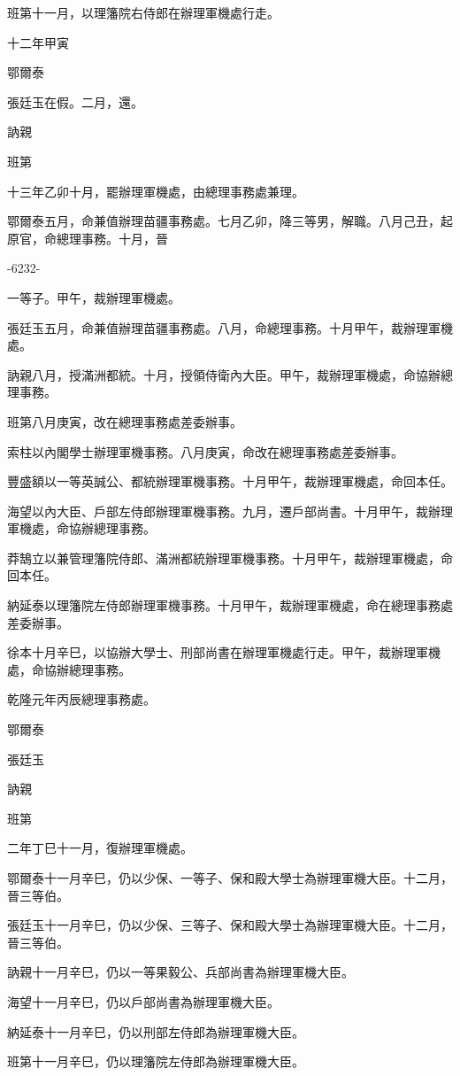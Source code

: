 \begin{pinyinscope}
班第十一月，以理籓院右侍郎在辦理軍機處行走。

十二年甲寅

鄂爾泰

張廷玉在假。二月，還。

訥親

班第

十三年乙卯十月，罷辦理軍機處，由總理事務處兼理。

鄂爾泰五月，命兼值辦理苗疆事務處。七月乙卯，降三等男，解職。八月己丑，起原官，命總理事務。十月，晉

-6232-

一等子。甲午，裁辦理軍機處。

張廷玉五月，命兼值辦理苗疆事務處。八月，命總理事務。十月甲午，裁辦理軍機處。

訥親八月，授滿洲都統。十月，授領侍衛內大臣。甲午，裁辦理軍機處，命協辦總理事務。

班第八月庚寅，改在總理事務處差委辦事。

索柱以內閣學士辦理軍機事務。八月庚寅，命改在總理事務處差委辦事。

豐盛額以一等英誠公、都統辦理軍機事務。十月甲午，裁辦理軍機處，命回本任。

海望以內大臣、戶部左侍郎辦理軍機事務。九月，遷戶部尚書。十月甲午，裁辦理軍機處，命協辦總理事務。

莽鵠立以兼管理籓院侍郎、滿洲都統辦理軍機事務。十月甲午，裁辦理軍機處，命回本任。

納延泰以理籓院左侍郎辦理軍機事務。十月甲午，裁辦理軍機處，命在總理事務處差委辦事。

徐本十月辛巳，以協辦大學士、刑部尚書在辦理軍機處行走。甲午，裁辦理軍機處，命協辦總理事務。

乾隆元年丙辰總理事務處。

鄂爾泰

張廷玉

訥親

班第

二年丁巳十一月，復辦理軍機處。

鄂爾泰十一月辛巳，仍以少保、一等子、保和殿大學士為辦理軍機大臣。十二月，晉三等伯。

張廷玉十一月辛巳，仍以少保、三等子、保和殿大學士為辦理軍機大臣。十二月，晉三等伯。

訥親十一月辛巳，仍以一等果毅公、兵部尚書為辦理軍機大臣。

海望十一月辛巳，仍以戶部尚書為辦理軍機大臣。

納延泰十一月辛巳，仍以刑部左侍郎為辦理軍機大臣。

班第十一月辛巳，仍以理籓院左侍郎為辦理軍機大臣。


\end{pinyinscope}
